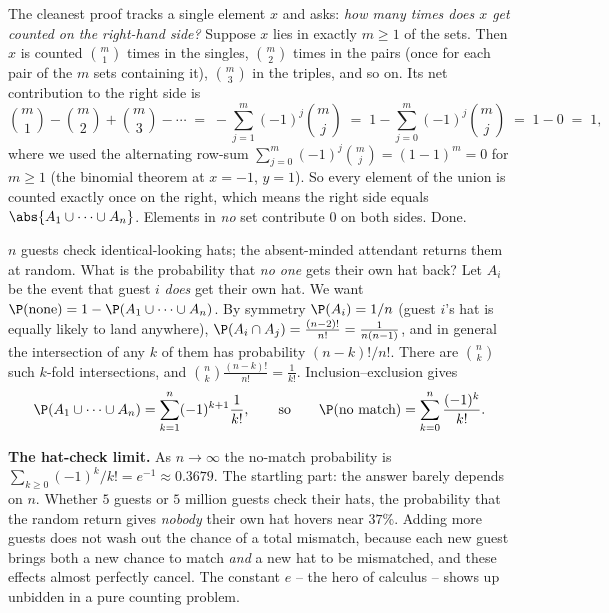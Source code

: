 \begin{whybox}
The cleanest proof tracks a single element $x$ and asks: \emph{how many times does $x$ get
counted on the right-hand side?} Suppose $x$ lies in exactly $m \ge 1$ of the sets. Then $x$
is counted $\binom{m}{1}$ times in the singles, $\binom{m}{2}$ times in the pairs (once for
each pair of the $m$ sets containing it), $\binom{m}{3}$ in the triples, and so on. Its net
contribution to the right side is
\[
  \binom{m}{1} - \binom{m}{2} + \binom{m}{3} - \cdots
  \;=\; -\sum_{j=1}^{m} (-1)^{j}\binom{m}{j}
  \;=\; 1 - \sum_{j=0}^{m} (-1)^{j}\binom{m}{j}
  \;=\; 1 - 0 \;=\; 1,
\]
where we used the alternating row-sum $\sum_{j=0}^{m}(-1)^j\binom{m}{j} = (1-1)^m = 0$ for
$m \ge 1$ (the binomial theorem at $x=-1$, $y=1$). So every element of the union is counted
exactly once on the right, which means the right side equals $\abs{A_1\cup\cdots\cup A_n}$.
Elements in \emph{no} set contribute $0$ on both sides. Done.
\end{whybox}

\begin{example}
\label{ch2:ex-derange}
$n$ guests check identical-looking hats; the absent-minded attendant returns them at
random. What is the probability that \emph{no one} gets their own hat back? Let $A_i$ be the
event that guest $i$ \emph{does} get their own hat. We want $\P(\text{none}) = 1 -
\P(A_1 \cup \cdots \cup A_n)$. By symmetry $\P(A_i) = 1/n$ (guest $i$'s hat is equally likely
to land anywhere), $\P(A_i \cap A_j) = \frac{(n-2)!}{n!} = \frac{1}{n(n-1)}$, and in general
the intersection of any $k$ of them has probability $(n-k)!/n!$. There are $\binom{n}{k}$
such $k$-fold intersections, and $\binom{n}{k}\frac{(n-k)!}{n!} = \frac{1}{k!}$. Inclusion--exclusion gives
\[
  \P(A_1\cup\cdots\cup A_n) = \sum_{k=1}^{n} (-1)^{k+1}\frac{1}{k!},
  \qquad\text{so}\qquad
  \P(\text{no match}) = \sum_{k=0}^{n}\frac{(-1)^k}{k!}.
\]
\end{example}

\begin{paradoxbox}
\textbf{The hat-check limit.} As $n \to \infty$ the no-match probability is
$\sum_{k\ge 0}(-1)^k/k! = e^{-1} \approx 0.3679$. The startling part: the answer barely
depends on $n$. Whether $5$ guests or $5$ million guests check their hats, the probability
that the random return gives \emph{nobody} their own hat hovers near $37\%$. Adding more
guests does not wash out the chance of a total mismatch, because each new guest brings both
a new chance to match \emph{and} a new hat to be mismatched, and these effects almost
perfectly cancel. The constant $e$ -- the hero of calculus -- shows up unbidden in a pure
counting problem.
\end{paradoxbox}

